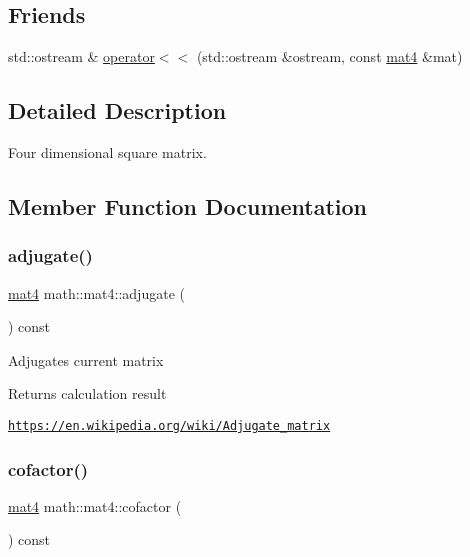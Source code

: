 \subsection*{Friends}
\begin{DoxyCompactItemize}
\item 
std\+::ostream \& \hyperlink{structmath_1_1mat4_a8cf54e779651b64900748420b9e5137b}{operator$<$$<$} (std\+::ostream \&ostream, const \hyperlink{structmath_1_1mat4}{mat4} \&mat)
\end{DoxyCompactItemize}


\subsection{Detailed Description}
Four dimensional square matrix. 

\subsection{Member Function Documentation}
\mbox{\label{structmath_1_1mat4_acc9c38d9696581fdb745f62ddfeb2f43}} 
\subsubsection{\texorpdfstring{adjugate()}{adjugate()}}
{\footnotesize\ttfamily \hyperlink{structmath_1_1mat4}{mat4} math\+::mat4\+::adjugate (\begin{DoxyParamCaption}{ }\end{DoxyParamCaption}) const\hspace{0.3cm}{\ttfamily [inline]}}

Adjugates current matrix \begin{DoxyReturn}{Returns}
calculation result
\end{DoxyReturn}
\href{https://en.wikipedia.org/wiki/Adjugate_matrix}{\tt https\+://en.\+wikipedia.\+org/wiki/\+Adjugate\+\_\+matrix} \mbox{\label{structmath_1_1mat4_af44ca96fa89e53b4950608b25e2cafe8}} 
\subsubsection{\texorpdfstring{cofactor()}{cofactor()}}
{\footnotesize\ttfamily \hyperlink{structmath_1_1mat4}{mat4} math\+::mat4\+::cofactor (\begin{DoxyParamCaption}{ }\end{DoxyParamCaption}) const\hspace{0.3cm}{\ttfamily [inline]}}

